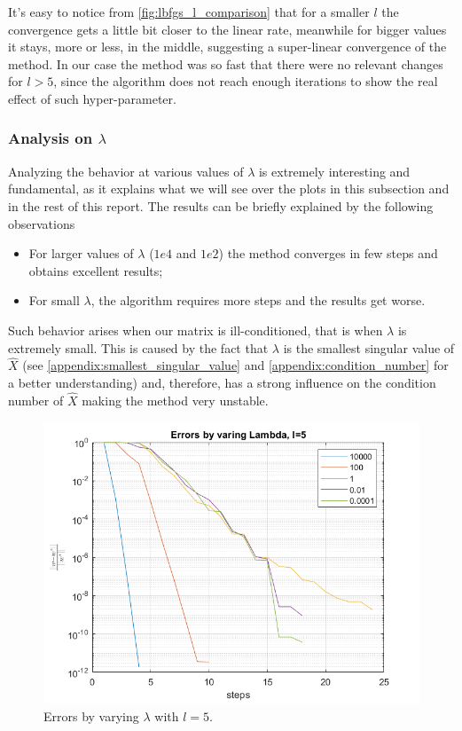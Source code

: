 \noindent It's easy to notice from \autoref{fig:lbfgs_l_comparison} that for a smaller $l$ the convergence gets a little bit closer to the linear rate, meanwhile for bigger values it stays, more or less, in the middle, suggesting a super-linear convergence of the method. In our case the method was so fast that there were no relevant changes for $l>5$, since the algorithm does not reach enough iterations to show the real effect of such hyper-parameter.

\subsubsection{Analysis on \texorpdfstring{$\lambda$}{{}}} \label{subsubsec:lbfgs_lambda_analysis}
Analyzing the behavior at various values of $\lambda$ is extremely interesting and fundamental, as it explains what we will see over the plots in this subsection and in the rest of this report. The results can be briefly explained by the following observations
\begin{itemize}
    \item For larger values of $\lambda$ ($1e4$ and $1e2$) the method converges in few steps and obtains excellent results;
    \item For small $\lambda$, the algorithm requires more steps and the results get worse.
\end{itemize}

\noindent Such behavior arises when our matrix is ill-conditioned, that is when $\lambda$ is extremely small. This is caused by the fact that $\lambda$ is the smallest singular value  of $\hat{X}$ (see \ref{appendix:smallest_singular_value} and \ref{appendix:condition_number} for a better understanding) and, therefore, has a strong influence on the condition number of $\hat{X}$ making the method very unstable.

\begin{figure}[H]
    \centering
    \includegraphics[width=0.8\linewidth]{images/lbfgs/errors_lambda.png}
    \caption{Errors by varying $\lambda$ with $l=5$.}
    \label{fig:lbfgs_errors_comparison_lambda}
\end{figure}

